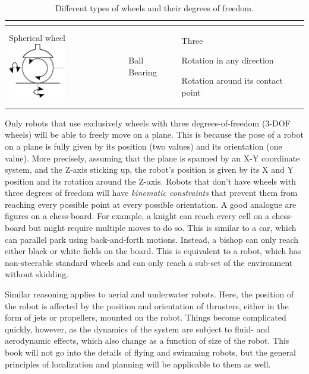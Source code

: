 \begin{table}
\begin{tabular}{p{2.8cm}p{3cm}p{4cm}}
\begin{compactitem}
\end{compactitem}\\
\hline
Spherical wheel \includegraphics[width=2.5cm]{figs/wheeltype_spherical.png}& Ball Bearing & Three
\begin{compactitem}
\item Rotation in any direction
\item Rotation around its contact point
\end{compactitem}\\
\hline
\end{tabular}
\caption{Different types of wheels and their degrees of freedom.\label{tab:wheels}}
\end{table}

Only robots that use exclusively wheels with three degrees-of-freedom (3-DOF wheels) will be able to freely move on a plane. This is because the pose of a robot on a plane is fully given by its position (two values) and its orientation (one value). More precisely, assuming that the plane is spanned by an X-Y coordinate system, and the Z-axis sticking up, the robot's position is given by its X and Y position and its rotation around the Z-axis. Robots that don't have wheels with three degrees of freedom will have \emph{kinematic constraints} that prevent them from reaching every possible point at every possible orientation. A good analogue are figures on a chess-board. For example, a knight can reach every cell on a chess-board but might require multiple moves to do so. This is similar to a car, which can parallel park using back-and-forth motions. Instead, a bishop can only reach either black or white fields on the board. This is equivalent to a robot, which has non-steerable standard wheels and can only reach a sub-set of the environment without skidding.

Similar reasoning applies to aerial and underwater robots. Here, the position of the robot is affected by the position and orientation of thrusters, either in the form of jets or propellers, mounted on the robot. Things become complicated quickly, however, as the dynamics of the system are subject to fluid- and aerodynamic effects, which also change as a function of size of the robot. This book will not go into the details of flying and swimming robots, but the general principles of localization and planning will be applicable to them as well.

